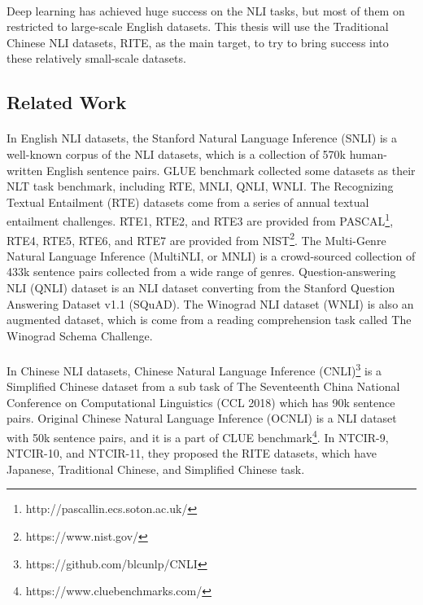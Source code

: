 \documentclass[12pt]{article}
\begin{document}
\begin{CJK*}{UTF8}{bkai}
\begin{spacing}{1.77}
\paragraph{}
Deep learning has achieved huge success on the NLI tasks, but most of them on restricted to large-scale English datasets. This thesis will use the Traditional Chinese NLI datasets, RITE, as the main target, to try to bring success into these relatively small-scale datasets.

\subsection{Related Work}
\paragraph{}
In English NLI datasets, the Stanford Natural Language Inference (SNLI)\cite{snli:emnlp2015} is a well-known corpus of the NLI datasets, which is a collection of 570k human-written English sentence pairs. GLUE benchmark collected some datasets as their NLT task benchmark, including RTE, MNLI, QNLI, WNLI. The Recognizing Textual Entailment (RTE) datasets come from a series of annual textual entailment challenges. RTE1\cite{dagan2006pascal}, RTE2\cite{bar2006second}, and RTE3\cite{giampiccolo2007third} are provided from PASCAL\footnote{http://pascallin.ecs.soton.ac.uk/}, RTE4, RTE5\cite{bentivogli2009fifth}, RTE6, and RTE7 are provided from NIST\footnote{https://www.nist.gov/}. The Multi-Genre Natural Language Inference (MultiNLI, or MNLI)\cite{N18-1101} is a crowd-sourced collection of 433k sentence pairs collected from a wide range of genres. Question-answering NLI (QNLI)\cite{wang2019glue} dataset is an NLI dataset converting from the Stanford Question Answering Dataset v1.1 (SQuAD)\cite{rajpurkar2016squad}. The Winograd NLI dataset (WNLI) is also an augmented dataset, which is come from a reading comprehension task called The Winograd Schema Challenge\cite{levesque2011winograd}.

\paragraph{}
In Chinese NLI datasets, Chinese Natural Language Inference (CNLI)\footnote{https://github.com/blcunlp/CNLI} is a Simplified Chinese dataset from a sub task of The Seventeenth China National Conference on Computational Linguistics (CCL 2018) which has 90k sentence pairs. Original Chinese Natural Language Inference (OCNLI) is a NLI dataset with 50k sentence pairs, and it is a part of CLUE benchmark\footnote{https://www.cluebenchmarks.com/}. In NTCIR-9\cite{ntcir9rite1}, NTCIR-10\cite{ntcir10rite2}, and NTCIR-11\cite{ntcir11rite-val}, they proposed the RITE datasets, which have Japanese, Traditional Chinese, and Simplified Chinese task.


\end{spacing}
\end{CJK*}
\end{document}
